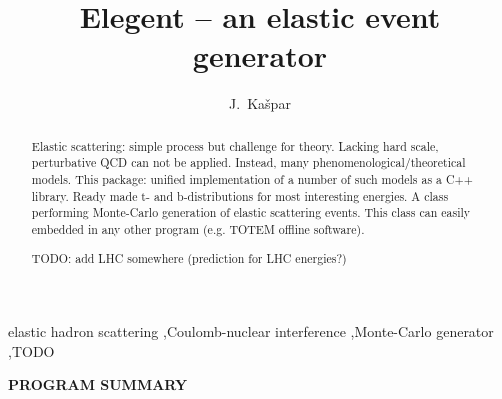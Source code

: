 \documentclass[preprint,12pt]{elsarticle}
\begin{document}
\begin{frontmatter}

\title{Elegent -- an elastic event generator}

\author{J.~Ka\v spar}
\address{CERN, Geneva, Switzerland}



\begin{abstract}
Elastic scattering: simple process but challenge for theory. Lacking hard scale, perturbative QCD can not be applied. Instead, many phenomenological/theoretical models. This package: unified implementation of a number of such models as a C++ library. Ready made t- and b-distributions for most interesting energies. A class performing Monte-Carlo generation of elastic scattering events. This class can easily embedded in any other program (e.g. TOTEM offline software).

TODO: add LHC somewhere (prediction for LHC energies?)
\end{abstract}

\begin{keyword}
elastic hadron scattering \sep Coulomb-nuclear interference \sep Monte-Carlo generator \sep TODO

\end{keyword}

\end{frontmatter}



\newpage

\noindent
{\bf PROGRAM SUMMARY}
\end{document}
